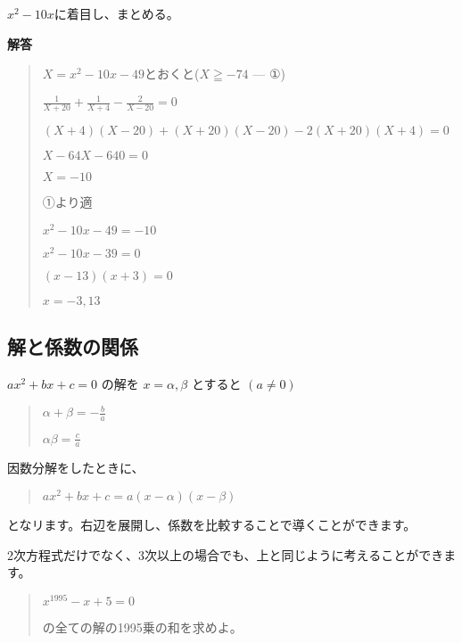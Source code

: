 \documentclass[uplatex,fleqn]{jsbook}
\begin{document}
\vspace{15pt}

$x^2-10x$に着目し、まとめる。

\vspace{15pt} {\large \textbf{解答}}
\begin{quote}
    $X=x^2-10x-49$とおくと($X\geqq-74$ --- ①)

    $\displaystyle \frac{1}{X+20}+\frac{1}{X+4}-\frac{2}{X-20}=0$

    $(X+4)(X-20)+(X+20)(X-20)-2(X+20)(X+4)=0$

    $X-64X-640=0$

    $X=-10$

    ①より適

    $x^2-10x-49=-10$

    $x^2-10x-39=0$

    $(x-13)(x+3)=0$

    $x=-3,13$
\end{quote}

\subsection{解と係数の関係}

$ax^2+bx+c=0$
の解を
$x=\alpha,\beta$
とすると
$(a\neq0)$
\begin{quote}
    $\displaystyle \alpha+\beta=-\frac{b}{a}$

    $\displaystyle \alpha\beta=\frac{c}{a}$
\end{quote}
因数分解をしたときに、
\begin{quote}
    $ax^2+bx+c=a(x-\alpha)(x-\beta)$
\end{quote}
となリます。右辺を展開し、係数を比較することで導くことができます。

2次方程式だけでなく、3次以上の場合でも、上と同じように考えることができます。

\begin{quote}
    $x^{1995}-x+5=0$

    の全ての解の1995乗の和を求めよ。
\end{quote}
\end{document}
